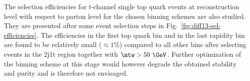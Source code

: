 
The selection efficiencies for $t$-channel single top quark events at reconstruction level with respect to parton level for the chosen binning schemes are also studied. They are presented after some event selection steps in Fig.~\ref{fig:diff13-sel-efficiencies}. The efficiencies in the first top quark \pt bin and in the last rapidity bin are found to be relatively small ($\approx 1\%$)  compared to all other bins after selecting events in the 2j1t region together with $\mtw>50~\GeV$. Further optimization of the binning scheme at this stage would however degrade the obtained stability and purity and is therefore not envisaged.

